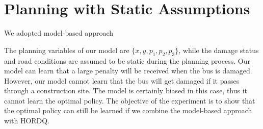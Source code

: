 \section{Planning with Static Assumptions}
\label{se:Model}

We adopted model-based approach 

The planning variables of our model are $\{x, y, p_1, p_2, p_3\}$, while the damage
status and road conditions are assumed to be static during the planning process.
Our model can learn that a large penalty will be received when the bus is damaged.  
However, our model cannot learn that the bus will get damaged if it passes through
a construction site. The model is certainly biased in this case, thus
it cannot learn the optimal policy. The objective of 
the experiment is to show that the optimal policy can still be learned
if we combine the model-based approach with HORDQ. 



